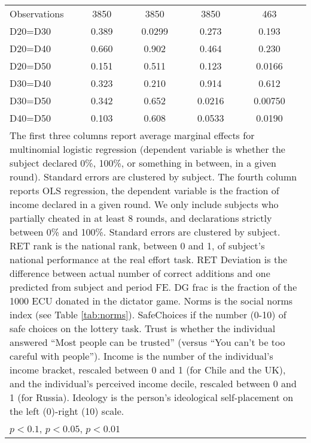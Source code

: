 \begin{tabular}{l|cccccc|cc}
\hline
Observations    &     3850         &         &     3850         &         &     3850         &         &      463         &         \\
D20=D30         &    0.389         &         &   0.0299         &         &    0.273         &         &    0.193         &         \\
D20=D40         &    0.660         &         &    0.902         &         &    0.464         &         &    0.230         &         \\
D20=D50         &    0.151         &         &    0.511         &         &    0.123         &         &   0.0166         &         \\
D30=D40         &    0.323         &         &    0.210         &         &    0.914         &         &    0.612         &         \\
D30=D50         &    0.342         &         &    0.652         &         &   0.0216         &         &  0.00750         &         \\
D40=D50         &    0.103         &         &    0.608         &         &   0.0533         &         &   0.0190         &         \\
\hline\hline
\multicolumn{9}{p{16cm}}{\tiny The first three columns report average marginal effects for multinomial logistic regression (dependent variable is whether the subject declared 0\%, 100\%, or something in between, in a given round). Standard errors are clustered by subject. The fourth column reports OLS regression, the dependent variable is the fraction of income declared in a given round. We only include subjects who partially cheated in at least 8 rounds, and declarations strictly between 0\% and 100\%. Standard errors are clustered by subject. RET rank is the national rank, between 0 and 1, of subject's national performance at the real effort task. RET Deviation is the difference between actual number of correct additions and one predicted from subject and period FE. DG frac is the fraction of the 1000 ECU donated in the dictator game. Norms is the social norms index (see Table \ref{tab:norms}). SafeChoices if the number (0-10) of safe choices on the lottery task. Trust is whether the individual answered ``Most people can be trusted'' (versus ``You can't be too careful with people''). Income is the number of the individual's income bracket, rescaled between 0 and 1 (for Chile and the UK), and the individual's perceived income decile, rescaled between 0 and 1 (for Russia). Ideology is the person's ideological self-placement on the left (0)-right (10) scale.}\\
\multicolumn{9}{l}{\tiny \sym{*} \(p<0.1\), \sym{**} \(p<0.05\), \sym{***} \(p<0.01\)}\\
\end{tabular}